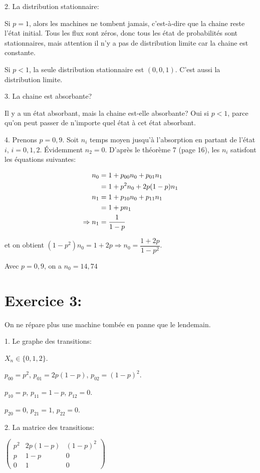 \documentclass[a4paper,twoside,12pt]{article}
\begin{document}
2. La distribution stationnaire:

Si $p=1$, alors les machines ne tombent jamais, c'est-à-dire que la chaine reste l'état initial. Tous les flux sont zéros, donc tous les état de probabilités sont stationnaires, mais attention il n'y a pas de distribution limite car la chaine est constante.

Si $p<1$, la seule distribution stationnaire est $(0, 0, 1)$. C'est aussi la distribution limite.

3. La chaine est absorbante?

Il y a un état absorbant, mais la chaine est-elle absorbante? Oui si $p < 1$, parce qu'on peut passer de n'importe quel état à cet état absorbant.

4. Prenons $p = 0,9$. Soit $n_i$ temps moyen jusqu'à l'absorption en partant de l'état $i$, $i = 0, 1, 2$. Évidemment $n_2 = 0$. D'après le théorème 7 (page 16), les $n_i$ satisfont les équations suivantes:

\begin{align}
    n_0 &= 1 + p_{00}n_0 + p_{01}n_1 \notag \\
    &= 1 + p^2n_0 + 2p(1-p)n_1 \notag \\
    n_1 &= 1 + p_{10}n_0 + p_{11}n_1 \notag \\
    &= 1 + pn_1 \notag \\
    \Rightarrow n_1 &= \dfrac{1}{1-p} \notag
\end{align}

et on obtient $(1-p^2)n_0 = 1+2p \Rightarrow n_0 = \dfrac{1+2p}{1-p^2}$.

Avec $p=0,9$, on a $n_0 = 14,74$

\section{Exercice 3:}
On ne répare plus une machine tombée en panne que le lendemain.

1. Le graphe des transitions:

$X_n \in \{0, 1, 2\}$.

$p_{00} = p^2$, $p_{01} = 2p(1-p)$, $p_{02} = (1-p)^2$.

$p_{10} = p$, $p_{11} = 1-p$, $p_{12} = 0$.

$p_{20} = 0$, $p_{21} = 1$, $p_{22} = 0$.

2. La matrice des transitions:

$\left(
\begin{array}{ccc}
    p^2 & 2p(1-p) & (1-p)^2 \\
    p & 1-p & 0 \\
    0 & 1 & 0
\end{array}\right)$
\end{document}
